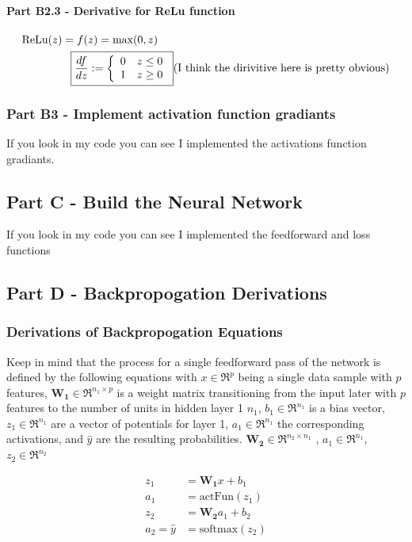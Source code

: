 \documentclass[]{article}
\begin{document}
\paragraph{Part B2.3 - Derivative for ReLu function}
\begin{align*} 
\text{ReLu}(z) = f(z)& = \text{max}(0,z)\\
\Aboxed{ \frac{df}{dz} : &= \left\{
    \begin{array}{ll}
      0 ~~~ z\leq 0 \\ 
      1 ~~~ z\geq 0 \\
    \end{array}
  \right. } \text{(I think the dirivitive here is pretty obvious)}\\
\end{align*}


\subsubsection{Part B3 - Implement activation function gradiants}
If you look in my code you can see I implemented the activations function gradiants. 

\subsection{Part C - Build the Neural Network}
If you look in my code you can see I implemented the feedforward and loss functions
\subsection{Part D - Backpropogation Derivations}
\subsubsection{Derivations of Backpropogation Equations}
Keep in mind that the process for a single feedforward pass of the network is defined by the following equations with $x\in \Re^{p}$ being a single data sample with $p$ features, $\mathbf{W_1} \in \Re^{n_1  \times p}$ is a weight matrix transitioning from the input later with $p$ features to the number of units in hidden layer 1 $n_1$, $b_1\in \Re^{n_1}$ is a bias vector, $z_1\in \Re^{n_1}$ are a vector of potentials for layer 1,  $a_1\in \Re^{n_1}$ the corresponding activations, and $\hat{y}$ are the resulting probabilities. $\mathbf{W_2} \in \Re^{n_2 \times n_1}$ , $a_1 \in \Re^{n_1}$, $z_2 \in \Re^{n_2}$

\begin{align*}
z_1 &= \mathbf{W_1}x + b_1\\
a_1 &= \text{actFun}(z_1)\\
z_2 &= \mathbf{W_2}a_1+b_2 \\
a_2 = \hat{y} &= \text{softmax}(z_2) \\ 
\end{align*}
\end{document}
